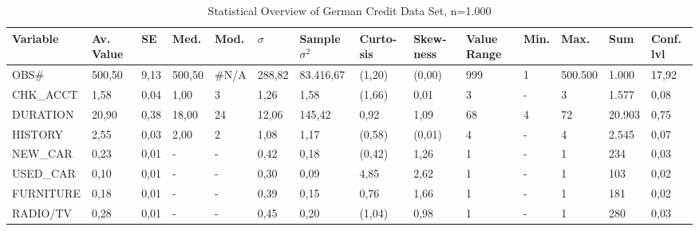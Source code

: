 \begin{table}[]
	\centering
	\caption{Statistical Overview of German Credit Data Set, n=1.000}
	\label{overview}
	\begin{tabular}{|p{2.6cm}|p{0.75cm}|p{0.6cm}|p{0.75cm}|p{0.6cm}|p{0.75cm}|p{1.2cm}|p{0.6cm}|p{0.65cm}|p{0.7cm}|p{0.45cm}|p{0.65cm}|p{0.85cm}|p{0.55cm}|}\hline
		{\tiny \textbf{Variable}}
		&{\tiny \textbf{Av. Value}}&{\tiny \textbf{SE}}&{\tiny \textbf{Med.}}&\textbf{{\tiny Mod.}} &\textbf{$\sigma$}&\textbf{{\tiny Sample }}$\sigma^2$&{\tiny\textbf{Curto- sis}}&
		{\tiny\textbf{Skew- ness}}
		&{\tiny \textbf{Value Range}}&{\tiny \textbf{Min.}}&{\tiny \textbf{Max.}}&{\tiny \textbf{Sum}}
		&\textbf{{\tiny Conf. lvl}}\\\hline
		{\tiny OBS\#}
		&{\tiny 500,50}&{\tiny 9,13}&{\tiny 500,50}&{\tiny \#N/A}
		&{\tiny 288,82}&{\tiny 83.416,67}&{\tiny (1,20)}&{\tiny (0,00)}
		&{\tiny 999}&{\tiny 1}&{\tiny 500.500}&{\tiny 1.000}&{\tiny 17,92}\\ \hline
		{\tiny CHK\_ACCT}
		&{\tiny 1,58}&{\tiny 0,04}&{\tiny 1,00}&{\tiny 3}
		&{\tiny 1,26}&{\tiny 1,58}&{\tiny (1,66)}&{\tiny 0,01}
		&{\tiny 3}&{\tiny - }&{\tiny 3}&{\tiny 1.577}&{\tiny 0,08}\\ \hline
		{\tiny DURATION}
		&{\tiny 20,90}&{\tiny 0,38}&{\tiny 18,00}&{\tiny 24}
		&{\tiny 12,06}&{\tiny 145,42}&{\tiny 0,92}&{\tiny 1,09}
		&{\tiny 68}&{\tiny 4}&{\tiny 72}&{\tiny 20.903}&{\tiny 0,75}\\ \hline
		{\tiny HISTORY}
		&{\tiny 2,55}&{\tiny 0,03}&{\tiny 2,00}&{\tiny 2}
		&{\tiny 1,08}&{\tiny 1,17}&{\tiny (0,58)}&{\tiny (0,01)}
		&{\tiny 4}&{\tiny -}&{\tiny 4}&{\tiny 2.545}&{\tiny 0,07}\\ \hline
		{\tiny NEW\_CAR}
		&{\tiny 0,23}&{\tiny 0,01}&{\tiny -}&{\tiny -}
		&{\tiny 0,42}&{\tiny 0,18}&{\tiny (0,42)}&{\tiny 1,26}
		&{\tiny 1}&{\tiny -}&{\tiny 1}&{\tiny 234}&{\tiny 0,03}\\ \hline
		{\tiny USED\_CAR}
		&{\tiny 0,10}&{\tiny 0,01}&{\tiny -}&{\tiny -}
		&{\tiny 0,30}&{\tiny 0,09}&{\tiny 4,85}&{\tiny 2,62}
		&{\tiny 1}&{\tiny -}&{\tiny 1}&{\tiny 103}&{\tiny 0,02}\\ \hline
		{\tiny FURNITURE}
		&{\tiny 0,18}&{\tiny 0,01}&{\tiny -}&{\tiny -}
		&{\tiny 0,39}&{\tiny 0,15}&{\tiny 0,76}&{\tiny 1,66}
		&{\tiny 1}&{\tiny -}&{\tiny 1}&{\tiny 181}&{\tiny 0,02}\\ \hline
		{\tiny RADIO/TV}
		&{\tiny 0,28}&{\tiny 0,01}&{\tiny -}&{\tiny -}
		&{\tiny 0,45}&{\tiny 0,20}&{\tiny (1,04)}&{\tiny 0,98}
		&{\tiny 1}&{\tiny -}&{\tiny 1}&{\tiny 280}&{\tiny 0,03}\\ \hline

\end{tabular}
\end{table}
